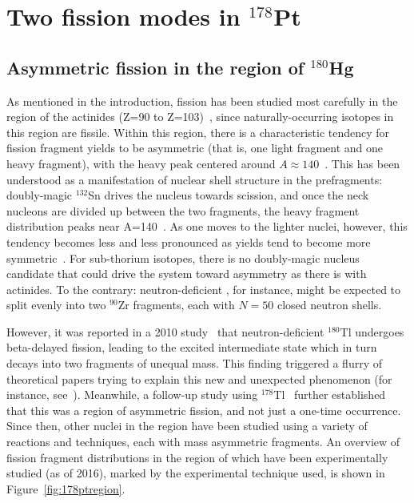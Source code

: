 \chapter{Two fission modes in $^{178}$Pt}\label{chap:178Pt}

\section{Asymmetric fission in the region of $^{180}$Hg}
As mentioned in the introduction, fission has been studied most carefully in the region of the actinides (Z=90 to Z=103)~\cite{Schmidt2018}, since naturally-occurring isotopes in this region are fissile. Within this region, there is a characteristic tendency for fission fragment yields to be asymmetric (that is, one light fragment and one heavy fragment), with the heavy peak centered around $A\approx140$~\cite{unik1974}. This has been understood as a manifestation of nuclear shell structure in the prefragments: doubly-magic $^{132}$Sn drives the nucleus towards scission, and once the neck nucleons are divided up between the two fragments, the heavy fragment distribution peaks near A=140~\cite{Wilkins1976}. As one moves to the lighter nuclei, however, this tendency becomes less and less pronounced as yields tend to become more symmetric~\cite{Schmidt2000,Schmidt2001}. For sub-thorium isotopes, there is no doubly-magic nucleus candidate that could drive the system toward asymmetry as there is with actinides. To the contrary: neutron-deficient {\Hg}, for instance, might be expected to split evenly into two $^{90}$Zr fragments, each with $N=50$ closed neutron shells.

However, it was reported in a 2010 study~\cite{Andreyev2010} that neutron-deficient $^{180}$Tl undergoes beta-delayed fission, leading to the excited intermediate state {\Hg} which in turn decays into two fragments of unequal mass. This finding triggered a flurry of theoretical papers trying to explain this new and unexpected phenomenon (for instance, see~\cite{Warda2012,Moller2012,Mcdonnell2014,Ichikawa2019}). Meanwhile, a follow-up study using $^{178}$Tl~\cite{Liberati2013} further established that this was a region of asymmetric fission, and not just a one-time occurrence. Since then, other nuclei in the region have been studied using a variety of reactions and techniques, each with mass asymmetric fragments. An overview of fission fragment distributions in the region of {\Hg} which have been experimentally studied (as of 2016), marked by the experimental technique used, is shown in Figure~\ref{fig:178ptregion}.

